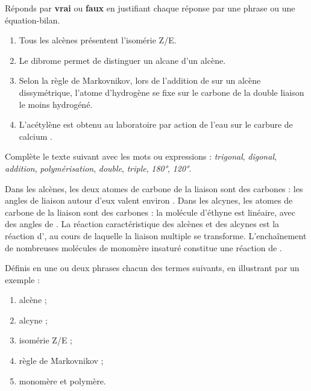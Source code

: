 \documentclass[11pt]{article}
\begin{document}
\begin{exercice}
Réponds par \textbf{vrai} ou \textbf{faux} en justifiant chaque réponse par une phrase ou une équation-bilan.
\begin{enumerate}
\item Tous les alcènes présentent l'isomérie Z/E.
\item Le dibrome  permet de distinguer un alcane d'un alcène.
\item Selon la règle de Markovnikov, lors de l'addition de  sur un alcène dissymétrique, l'atome d'hydrogène se fixe sur le carbone de la double liaison le moins hydrogéné.
\item L'acétylène  est obtenu au laboratoire par action de l'eau sur le carbure de calcium .
\end{enumerate}
\end{exercice}

\begin{exercice}
Complète le texte suivant avec les mots ou expressions : \emph{trigonal}, \emph{digonal}, \emph{addition}, \emph{polymérisation}, \emph{double}, \emph{triple}, \emph{\ang{180}}, \emph{\ang{120}}.

Dans les alcènes, les deux atomes de carbone de la liaison \dotfill{} sont des carbones \dotfill{} : les angles de liaison autour d'eux valent environ \dotfill{}. Dans les alcynes, les atomes de carbone de la liaison \dotfill{} sont des carbones \dotfill{} : la molécule d'éthyne est linéaire, avec des angles de \dotfill{}. La réaction caractéristique des alcènes et des alcynes est la réaction d'\dotfill{}, au cours de laquelle la liaison multiple se transforme. L'enchaînement de nombreuses molécules de monomère insaturé constitue une réaction de \dotfill{}.
\end{exercice}

\begin{exercice}[Définitions]
Définis en une ou deux phrases chacun des termes suivants, en illustrant par un exemple :
\begin{enumerate}
\item alcène ; \item alcyne ; \item isomérie Z/E ; \item règle de Markovnikov ; \item monomère et polymère.
\end{enumerate}
\end{exercice}
\end{document}
